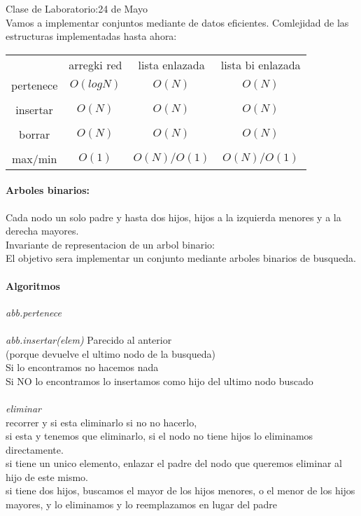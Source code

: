 \documentclass[a4paper,10pt]{article}
\begin{document}
{{\LARGE Clase de Laboratorio:}\hfill {24 de Mayo}}\\
Vamos a implementar conjuntos mediante de datos eficientes.
Comlejidad de las estructuras implementadas hasta ahora:
\begin{tabular}{c|c|c|c}
&arregki red& lista enlazada & lista bi enlazada\\    
pertenece & $O(logN)$ & $O(N)$ & $O(N)$ \\
\hline\\
insertar & $O(N)$ & $O(N)$ & $O(N)$ \\
\hline\\
borrar & $O(N)$ & $O(N)$ & $O(N)$ \\
\hline\\
max/min & $O(1)$ & $O(N)/O(1)$ & $O(N)/O(1)$ \\
\end{tabular}
\paragraph*{Arboles binarios:} Cada nodo un solo padre y hasta dos hijos, hijos a la izquierda menores y a la derecha mayores.
\\Invariante de representacion de un arbol binario: 
\\El objetivo sera implementar un conjunto mediante arboles binarios de busqueda.
\paragraph*{Algoritmos\\}
\emph{abb.pertenece}
\\
\\\emph{abb.insertar(elem)}
Parecido al anterior
\\(porque devuelve el ultimo nodo de la busqueda)
\\Si lo encontramos no hacemos nada
\\Si NO lo encontramos lo insertamos como hijo del ultimo nodo buscado
\\
\\\emph{eliminar}
\\recorrer y si esta eliminarlo si no no hacerlo,
\\si esta y tenemos que eliminarlo, si el nodo no tiene hijos lo eliminamos directamente.
\\si tiene un unico elemento, enlazar el padre del nodo que queremos eliminar al hijo de este mismo.
\\si tiene dos hijos, buscamos el mayor de los hijos menores, o el menor de los hijos mayores, y lo eliminamos y lo reemplazamos en lugar del padre
\end{document}
